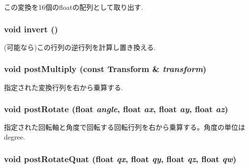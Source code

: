 この変換を16個のfloatの配列として取り出す. \hypertarget{classm3g_1_1Transform_7fa1616cc61c19a5efcc863c950f7f30}{
\subsubsection[{invert}]{\setlength{\rightskip}{0pt plus 5cm}void invert ()}}
\label{classm3g_1_1Transform_7fa1616cc61c19a5efcc863c950f7f30}


(可能なら)この行列の逆行列を計算し置き換える. \hypertarget{classm3g_1_1Transform_ad6083d90dbecc7e5bb39d5062723a0d}{
\subsubsection[{postMultiply}]{\setlength{\rightskip}{0pt plus 5cm}void postMultiply (const {\bf Transform} \& {\em transform})}}
\label{classm3g_1_1Transform_ad6083d90dbecc7e5bb39d5062723a0d}


指定された変換行列を右から乗算する. \hypertarget{classm3g_1_1Transform_4abf135257f132cdf9580f3a3e11ea6c}{
\subsubsection[{postRotate}]{\setlength{\rightskip}{0pt plus 5cm}void postRotate (float {\em angle}, \/  float {\em ax}, \/  float {\em ay}, \/  float {\em az})}}
\label{classm3g_1_1Transform_4abf135257f132cdf9580f3a3e11ea6c}


指定された回転軸と角度で回転する回転行列を右から乗算する。角度の単位はdegree. \hypertarget{classm3g_1_1Transform_7ce6ca00ac17bc4bb5f271c48da5e2dc}{
\subsubsection[{postRotateQuat}]{\setlength{\rightskip}{0pt plus 5cm}void postRotateQuat (float {\em qx}, \/  float {\em qy}, \/  float {\em qz}, \/  float {\em qw})}}
\label{classm3g_1_1Transform_7ce6ca00ac17bc4bb5f271c48da5e2dc}


